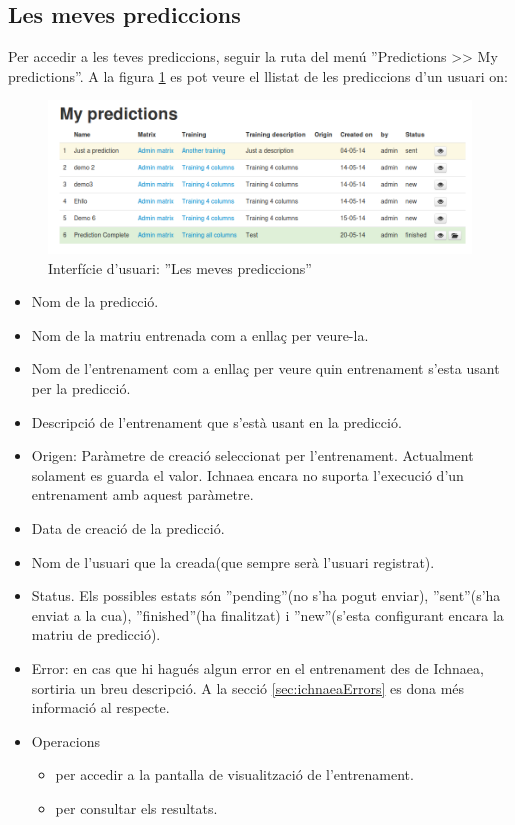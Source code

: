 \subsection{Les meves prediccions}
\label{subsec:myPrediccions}
Per accedir a les teves prediccions, seguir la ruta del menú ''Predictions >> My predictions''. A la figura \ref{fig:my_predictions} es pot veure el llistat de les prediccions d'un usuari on:
\begin{figure}[h!]
  \centering
  \includegraphics[scale=0.4]{img/userguide/my_predictions.png}
  \caption{Interfície d'usuari: ''Les meves prediccions''}
  \label{fig:my_predictions}
\end{figure}
\begin{itemize}
\item Nom de la predicció.
\item Nom de la matriu entrenada com a enllaç per veure-la.
\item Nom de l'entrenament com a enllaç per veure quin entrenament s'esta usant per la predicció.
\item Descripció de l'entrenament que s'est\`{a} usant en la predicció.
\item Origen: Paràmetre de creació seleccionat per l'entrenament. Actualment solament es guarda el valor. Ichnaea encara no suporta l'execució d'un entrenament amb aquest paràmetre.
\item Data de creaci\'{o} de la predicció.
\item Nom de l'usuari que la creada(que sempre serà l'usuari registrat).
\item Status. Els possibles estats s\'{o}n ''pending''(no s'ha pogut enviar), ''sent''(s'ha enviat a la cua), ''finished''(ha finalitzat) i ''new''(s'esta configurant encara la matriu de predicció).
\item Error: en cas que hi hagués algun error en el entrenament des de Ichnaea, sortiria un breu descripció. A la secció \ref{sec:ichnaeaErrors} es dona m\'{e}s informació al respecte.
\item Operacions
 \begin{itemize}
 \item \iconeyeopen per accedir a la pantalla de visualització de l'entrenament.
 \item \iconresults per consultar els resultats.
 \end{itemize}
\end{itemize}

